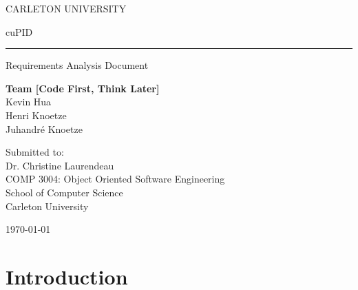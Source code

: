 \documentclass[12pt,letterpaper]{article}
\begin{document}
\renewcommand\headrule{}

\pagestyle{fancy}
\fancyhf{}
\rfoot{\thepage/\pageref{LastPage}}

\newcommand{\personone}{Kevin Hua}
\newcommand{\persontwo}{Henri Knoetze}
\newcommand{\personthree}{Juhandr\'e Knoetze}
\thispagestyle{empty}

\begin{center}
CARLETON UNIVERSITY
\end{center}

\vfill

\begin{center}
{\fontsize{55pt}{55pt}\selectfont cuPID}
\vspace{0.5em}\rule{\textwidth}{0.5pt}
Requirements Analysis Document
\end{center}

\vspace{5em}

\begin{center}
\textbf{Team [Code First, Think Later]}\\
\personone{}\\
\persontwo{}\\
\personthree{}
\end{center}

\vfill

\begin{center}
Submitted to:\\
Dr. Christine Laurendeau\\
COMP 3004: Object Oriented Software Engineering\\
School of Computer Science\\
Carleton University
\end{center}

\vspace{2em}

\begin{center}
\today
\end{center}

\newpage{}

\tableofcontents{}

\renewcommand{\listfigurename}{Figures}
\listoffigures

\renewcommand{\listtablename}{Tables}
\listoftables

\newpage{}

\section{Introduction}
\end{document}
